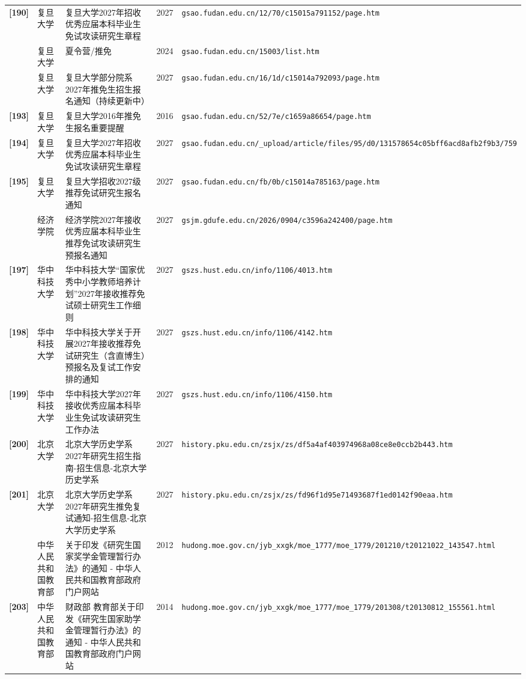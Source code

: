 {\begin{longtable}{@{}p{1.15cm}p{2.9cm}p{6.3cm}p{0.85cm}p{5.0cm}@{}}
\textbf{[190]} & 复旦大学 & 复旦大学2027年招收优秀应届本科毕业生免试攻读研究生章程 & 2027 & \texttt{gsao.fudan.edu.cn/12/70/c15015a791152/page.htm} \\
[191] & 复旦大学 & 夏令营/推免 & 2024 & \texttt{gsao.fudan.edu.cn/15003/list.htm} \\
[192] & 复旦大学 & 复旦大学部分院系2027年推免生招生报名通知（持续更新中） & 2027 & \texttt{gsao.fudan.edu.cn/16/1d/c15014a792093/page.htm} \\
\textbf{[193]} & 复旦大学 & 复旦大学2016年推免生报名重要提醒 & 2016 & \texttt{gsao.fudan.edu.cn/52/7e/c1659a86654/page.htm} \\
\textbf{[194]} & 复旦大学 & 复旦大学2027年招收优秀应届本科毕业生免试攻读研究生章程 & 2027 & \texttt{gsao.fudan.edu.cn/\_upload/article/files/95/d0/131578654c05bff6acd8afb2f9b3/759} \\
\textbf{[195]} & 复旦大学 & 复旦大学招收2027级推荐免试研究生报名通知 & 2027 & \texttt{gsao.fudan.edu.cn/fb/0b/c15014a785163/page.htm} \\
[196] & 经济学院 & 经济学院2027年接收优秀应届本科毕业生推荐免试攻读研究生预报名通知 & 2027 & \texttt{gsjm.gdufe.edu.cn/2026/0904/c3596a242400/page.htm} \\
\textbf{[197]} & 华中科技大学 & 华中科技大学“国家优秀中小学教师培养计划”2027年接收推荐免试硕士研究生工作细则 & 2027 & \texttt{gszs.hust.edu.cn/info/1106/4013.htm} \\
\textbf{[198]} & 华中科技大学 & 华中科技大学关于开展2027年接收推荐免试研究生（含直博生）预报名及复试工作安排的通知 & 2027 & \texttt{gszs.hust.edu.cn/info/1106/4142.htm} \\
\textbf{[199]} & 华中科技大学 & 华中科技大学2027年接收优秀应届本科毕业生免试攻读研究生工作办法 & 2027 & \texttt{gszs.hust.edu.cn/info/1106/4150.htm} \\
\textbf{[200]} & 北京大学 & 北京大学历史学系2027年研究生招生指南-招生信息-北京大学历史学系 & 2027 & \texttt{history.pku.edu.cn/zsjx/zs/df5a4af403974968a08ce8e0ccb2b443.htm} \\
\textbf{[201]} & 北京大学 & 北京大学历史学系2027年研究生推免复试通知-招生信息-北京大学历史学系 & 2027 & \texttt{history.pku.edu.cn/zsjx/zs/fd96f1d95e71493687f1ed0142f90eaa.htm} \\
[202] & 中华人民共和国教育部 & 关于印发《研究生国家奖学金管理暂行办法》的通知 - 中华人民共和国教育部政府门户网站 & 2012 & \texttt{hudong.moe.gov.cn/jyb\_xxgk/moe\_1777/moe\_1779/201210/t20121022\_143547.html} \\
\textbf{[203]} & 中华人民共和国教育部 & 财政部 教育部关于印发《研究生国家助学金管理暂行办法》的通知 - 中华人民共和国教育部政府门户网站 & 2014 & \texttt{hudong.moe.gov.cn/jyb\_xxgk/moe\_1777/moe\_1779/201308/t20130812\_155561.html} \\

\end{longtable}}
